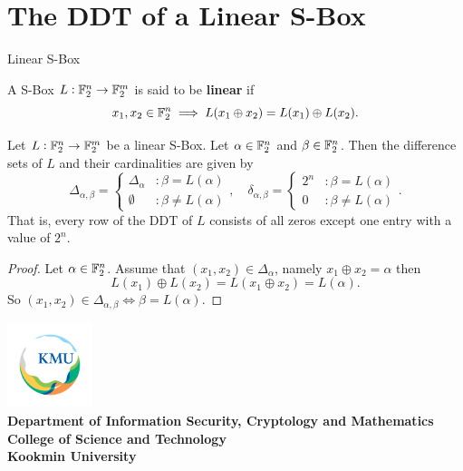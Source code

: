 \documentclass[11pt,openany]{article}
\newcommand{\footer}[1]{
\begin{flushright}
	\vspace{2em}
	\includegraphics[width=2.5cm]{school_logo.jpg} \\
	\vspace{1em}
	\textcolor{TealBlue2}{\small\textbf{#1}}
\end{flushright}
}
\begin{document}
\section{The DDT of a Linear S-Box}
\begin{defbox}{Linear S-Box}
\begin{definition}
A S-Box $L:\mathbb{F}_2^n\to\mathbb{F}_2^m$ is said to be \textbf{linear} if \[
x_1,x_2\in\mathbb{F}_2^n\implies L(x_1\oplus x_2)=L(x_1)\oplus L(x_2).
\]
\end{definition}
\end{defbox}
\vspace{12pt}
\begin{probox}{}
\begin{proposition}
Let $L:\mathbb{F}_2^n\to\mathbb{F}_2^m$ be a linear S-Box. Let $\alpha\in\mathbb{F}_2^n$ and $\beta\in\mathbb{F}_2^n$. Then the difference sets of $L$ and their cardinalities are given by \[
\Delta_{\alpha,\beta}=\begin{cases}
\Delta_\alpha &:\beta=L(\alpha)\\
\emptyset &:\beta\neq L(\alpha)
\end{cases},\quad \delta_{\alpha,\beta}=\begin{cases}
2^n &:\beta=L(\alpha)\\
0 &:\beta\neq L(\alpha)
\end{cases}.
\] That is, every row of the DDT of $L$ consists of all zeros except one entry with a value of $2^n$.
\end{proposition}
\end{probox}
\begin{proof}
	Let $\alpha\in\mathbb{F}_2^n$. Assume that $(x_1,x_2)\in\Delta_{\alpha}$, namely $x_1\oplus x_2=\alpha$ then \[
	L(x_1)\oplus L(x_2)=L(x_1\oplus x_2)=L(\alpha).
	\] So $(x_1,x_2)\in\Delta_{\alpha,\beta}\iff\beta=L(\alpha)$.
\end{proof}

\footer{Department of Information Security, Cryptology and Mathematics\\
	College of Science and Technology\\
	Kookmin University}

\newpage

%
%
\end{document}
